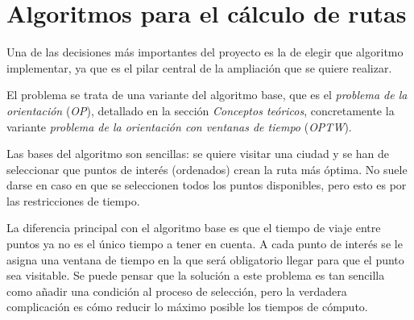 
\section{Algoritmos para el cálculo de rutas}
Una de las decisiones más importantes del proyecto es la de elegir que algoritmo implementar, ya que es el pilar central de la ampliación que se quiere realizar.

El problema se trata de una variante del algoritmo base, que es el \textit{problema de la orientación} (\textit{OP}), detallado en la sección \textit{Conceptos teóricos}, concretamente la variante \textit{problema de la orientación con ventanas de tiempo} (\textit{OPTW}).

Las bases del algoritmo son sencillas: se quiere visitar una ciudad y se han de seleccionar que puntos de interés (ordenados) crean la ruta más óptima. No suele darse en caso en que se seleccionen todos los puntos disponibles, pero esto es por las restricciones de tiempo.

La diferencia principal con el algoritmo base es que el tiempo de viaje entre puntos ya no es el único tiempo a tener en cuenta. A cada punto de interés se le asigna una ventana de tiempo en la que será obligatorio llegar para que el punto sea visitable. Se puede pensar que la solución a este problema es tan sencilla como añadir una condición al proceso de selección, pero la verdadera complicación es cómo reducir lo máximo posible los tiempos de cómputo.

